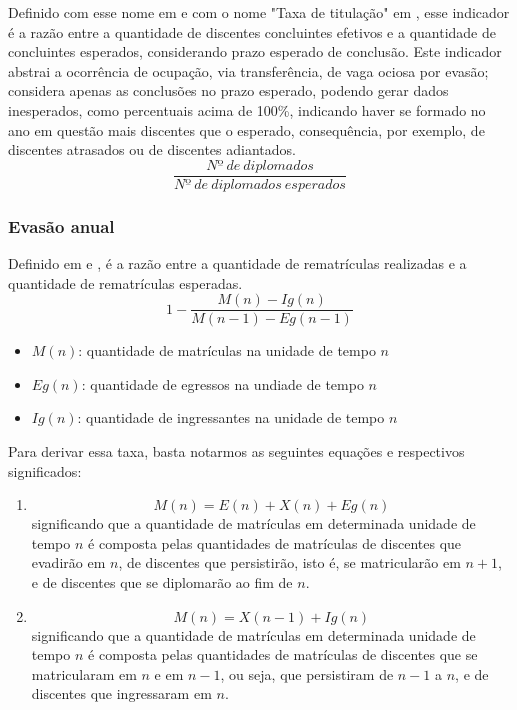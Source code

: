 \documentclass{report}
\begin{document}
Definido com esse nome em \cite{indicadores_TCU} e com o nome "Taxa de titulação" em \cite{mudanca_calculos}, esse indicador é a razão entre a quantidade de discentes concluintes efetivos e a quantidade de concluintes esperados, considerando prazo esperado de conclusão.
Este indicador abstrai a ocorrência de ocupação, via transferência, de vaga ociosa por evasão; considera apenas as conclusões no prazo esperado, podendo gerar dados inesperados, como percentuais acima de 100\%, indicando haver se formado no ano em questão mais discentes que o esperado, consequência, por exemplo, de discentes atrasados ou de discentes adiantados.
\begin{equation}
\frac{Nº\ de\ diplomados}{Nº\ de\ diplomados\ esperados}
\end{equation}


\subsubsection{Evasão anual}

Definido em \cite{esclarecimentos_calculos} e \cite{mudanca_calculos}, é a razão entre a quantidade de rematrículas realizadas e a quantidade de rematrículas esperadas.
\begin{equation}
1 - \frac{M(n) - Ig(n)}{M(n-1) - Eg(n-1)}
\end{equation}
\begin{itemize}
\item $M(n)$: quantidade de matrículas na unidade de tempo $n$
\item $Eg(n)$: quantidade de egressos na undiade de tempo $n$
\item $Ig(n)$: quantidade de ingressantes na unidade de tempo $n$
\end{itemize}

Para derivar essa taxa, basta notarmos as seguintes equações e respectivos significados:
\begin{enumerate}
\item 
\begin{equation}
M(n) = E(n) + X(n) + Eg(n)
\end{equation}
significando que a quantidade de matrículas em determinada unidade de tempo $n$ é composta pelas quantidades de matrículas de discentes que evadirão em $n$, de discentes que persistirão, isto é, se matricularão em $n+1$, e de discentes que se diplomarão ao fim de $n$.
\item 
\begin{equation}
M(n) = X(n-1) + Ig(n)
\end{equation}
significando que a quantidade de matrículas em determinada unidade de tempo $n$ é composta pelas quantidades de matrículas de discentes que se matricularam em $n$ e em $n-1$, ou seja, que persistiram de $n-1$ a $n$, e de discentes que ingressaram em $n$.
\end{enumerate}
\end{document}

